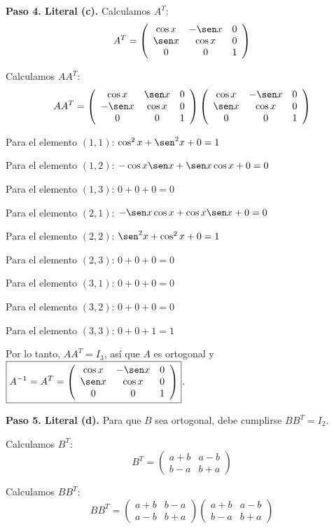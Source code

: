 \begin{prob}
\begin{myproof}
\textbf{Paso 4. Literal (c).} Calculamos $A^T$:
$$A^T = \left(\begin{array}{ccc}\cos x & -\sen x & 0 \\\sen x & \cos x & 0 \\0 & 0 & 1\end{array}\right)$$

Calculamos $AA^T$:
$$AA^T = \left(\begin{array}{ccc}\cos x & \sen x & 0 \\-\sen x & \cos x & 0 \\0 & 0 & 1\end{array}\right) \left(\begin{array}{ccc}\cos x & -\sen x & 0 \\\sen x & \cos x & 0 \\0 & 0 & 1\end{array}\right)$$

Para el elemento $(1,1)$: $\cos^2 x + \sen^2 x + 0 = 1$

Para el elemento $(1,2)$: $-\cos x \sen x + \sen x \cos x + 0 = 0$

Para el elemento $(1,3)$: $0 + 0 + 0 = 0$

Para el elemento $(2,1)$: $-\sen x \cos x + \cos x \sen x + 0 = 0$

Para el elemento $(2,2)$: $\sen^2 x + \cos^2 x + 0 = 1$

Para el elemento $(2,3)$: $0 + 0 + 0 = 0$

Para el elemento $(3,1)$: $0 + 0 + 0 = 0$

Para el elemento $(3,2)$: $0 + 0 + 0 = 0$

Para el elemento $(3,3)$: $0 + 0 + 1 = 1$

Por lo tanto, $AA^T = I_3$, así que $A$ es ortogonal y $\boxed{A^{-1} = A^T = \left(\begin{array}{ccc}\cos x & -\sen x & 0 \\\sen x & \cos x & 0 \\0 & 0 & 1\end{array}\right)}$.

\textbf{Paso 5. Literal (d).} Para que $B$ sea ortogonal, debe cumplirse $BB^T = I_2$.

Calculamos $B^T$:
$$B^T = \begin{pmatrix}a+b & a-b \\b-a & b+a\end{pmatrix}$$

Calculamos $BB^T$:
$$BB^T = \begin{pmatrix}a+b & b-a \\a-b & b+a\end{pmatrix} \begin{pmatrix}a+b & a-b \\b-a & b+a\end{pmatrix}$$


\end{myproof}
\end{prob}
